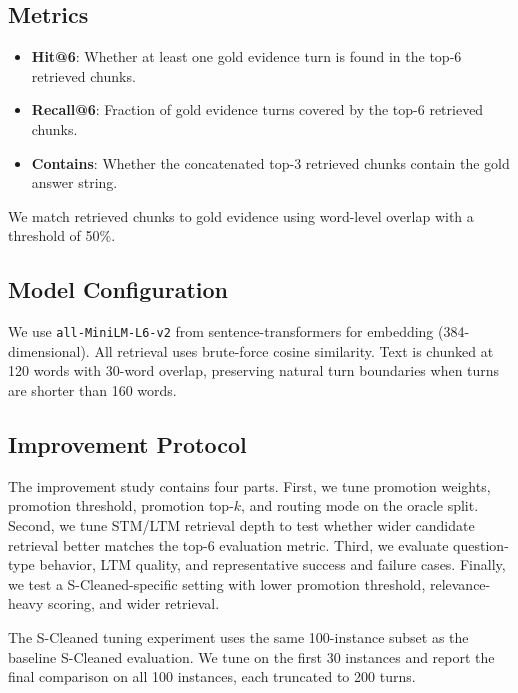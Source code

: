 \documentclass{article}
\begin{document}
\subsection{Metrics}

\begin{itemize}
    \item \textbf{Hit@6}: Whether at least one gold evidence turn is found in the top-6 retrieved chunks.
    \item \textbf{Recall@6}: Fraction of gold evidence turns covered by the top-6 retrieved chunks.
    \item \textbf{Contains}: Whether the concatenated top-3 retrieved chunks contain the gold answer string.
\end{itemize}

We match retrieved chunks to gold evidence using word-level overlap with a threshold of 50\%.

\subsection{Model Configuration}

We use \texttt{all-MiniLM-L6-v2} from sentence-transformers for embedding (384-dimensional). All retrieval uses brute-force cosine similarity. Text is chunked at 120 words with 30-word overlap, preserving natural turn boundaries when turns are shorter than 160 words.

\subsection{Improvement Protocol}

The improvement study contains four parts. First, we tune promotion weights, promotion threshold, promotion top-$k$, and routing mode on the oracle split. Second, we tune STM/LTM retrieval depth to test whether wider candidate retrieval better matches the top-6 evaluation metric. Third, we evaluate question-type behavior, LTM quality, and representative success and failure cases. Finally, we test a S-Cleaned-specific setting with lower promotion threshold, relevance-heavy scoring, and wider retrieval.

The S-Cleaned tuning experiment uses the same 100-instance subset as the baseline S-Cleaned evaluation. We tune on the first 30 instances and report the final comparison on all 100 instances, each truncated to 200 turns.

\end{document}
